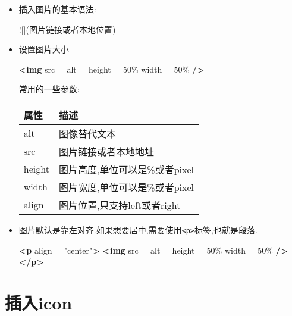 \documentclass[]{ctexbook}
\newenvironment{Shaded}{\begin{snugshade}}{\end{snugshade}}
\newcommand{\AlertTok}[1]{\textcolor[rgb]{0.94,0.16,0.16}{#1}}
\newcommand{\KeywordTok}[1]{\textcolor[rgb]{0.13,0.29,0.53}{\textbf{#1}}}
\newcommand{\OtherTok}[1]{\textcolor[rgb]{0.56,0.35,0.01}{#1}}
\newcommand{\StringTok}[1]{\textcolor[rgb]{0.31,0.60,0.02}{#1}}
\begin{document}
\begin{itemize}
\item
  插入图片的基本语法:

\begin{Shaded}
\begin{Highlighting}[]
\AlertTok{![](图片链接或者本地位置)}
\end{Highlighting}
\end{Shaded}
\item
  设置图片大小

\begin{Shaded}
\begin{Highlighting}[]
\KeywordTok{\textless{}img}\OtherTok{ src} \OtherTok{=} \StringTok{\textquotesingle{}\textquotesingle{}}\OtherTok{ alt} \OtherTok{=} \StringTok{\textquotesingle{}\textquotesingle{}}\OtherTok{ height} \OtherTok{=} \StringTok{50\%}\OtherTok{ width} \OtherTok{=} \StringTok{50\%} \KeywordTok{/\textgreater{}}
\end{Highlighting}
\end{Shaded}

  常用的一些参数:

  \begin{longtable}[]{@{}ll@{}}
  \toprule
  属性 & 描述\tabularnewline
  \midrule
  \endhead
  alt & 图像替代文本\tabularnewline
  src & 图片链接或者本地地址\tabularnewline
  height & 图片高度,单位可以是\%或者pixel\tabularnewline
  width & 图片宽度,单位可以是\%或者pixel\tabularnewline
  align & 图片位置,只支持left或者right\tabularnewline
  \bottomrule
  \end{longtable}
\item
  图片默认是靠左对齐.如果想要居中,需要使用\texttt{\textless{}p\textgreater{}}标签,也就是段落.

\begin{Shaded}
\begin{Highlighting}[]
\KeywordTok{\textless{}p}\OtherTok{ align} \OtherTok{=} \StringTok{"center"}\KeywordTok{\textgreater{}}
\KeywordTok{\textless{}img}\OtherTok{ src} \OtherTok{=} \StringTok{\textquotesingle{}\textquotesingle{}}\OtherTok{ alt} \OtherTok{=} \StringTok{\textquotesingle{}\textquotesingle{}}\OtherTok{ height} \OtherTok{=} \StringTok{50\%}\OtherTok{ width} \OtherTok{=} \StringTok{50\%} \KeywordTok{/\textgreater{}}
\KeywordTok{\textless{}/p\textgreater{}}
\end{Highlighting}
\end{Shaded}
\end{itemize}

\hypertarget{ux63d2ux5165icon}{%
\section{插入icon}\label{ux63d2ux5165icon}}
\end{document}

